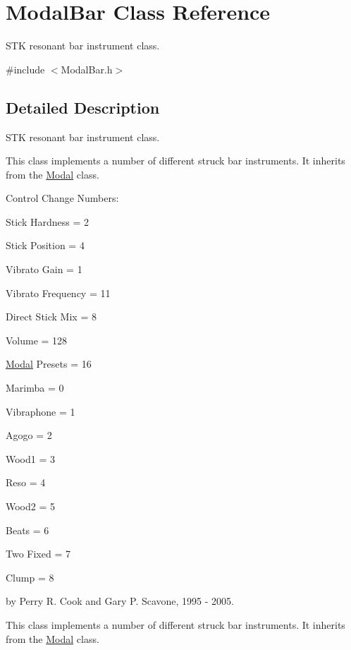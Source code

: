 \hypertarget{class_modal_bar}{}\section{Modal\+Bar Class Reference}
\label{class_modal_bar}


S\+TK resonant bar instrument class.  




{\ttfamily \#include $<$Modal\+Bar.\+h$>$}



\subsection{Detailed Description}
S\+TK resonant bar instrument class. 

This class implements a number of different struck bar instruments. It inherits from the \hyperlink{class_modal}{Modal} class.

Control Change Numbers\+:
\begin{DoxyItemize}
\item Stick Hardness = 2
\item Stick Position = 4
\item Vibrato Gain = 1
\item Vibrato Frequency = 11
\item Direct Stick Mix = 8
\item Volume = 128
\item \hyperlink{class_modal}{Modal} Presets = 16
\begin{DoxyItemize}
\item Marimba = 0
\item Vibraphone = 1
\item Agogo = 2
\item Wood1 = 3
\item Reso = 4
\item Wood2 = 5
\item Beats = 6
\item Two Fixed = 7
\item Clump = 8
\end{DoxyItemize}
\end{DoxyItemize}

by Perry R. Cook and Gary P. Scavone, 1995 -\/ 2005.

This class implements a number of different struck bar instruments. It inherits from the \hyperlink{class_modal}{Modal} class.

